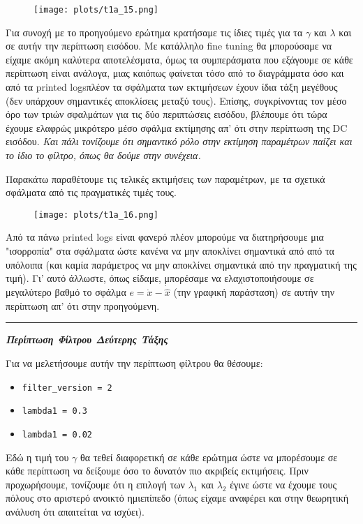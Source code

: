 \documentclass[12pt]{article} %
\numberwithin{equation}{section}  %
\begin{document}
\begin{figure}[h!]
    \centering
    \texttt{[image: plots/t1a\_15.png]}
    \caption{}
    \label{fig:t1a_15}
\end{figure}

Για συνοχή με το προηγούμενο ερώτημα κρατήσαμε τις ίδιες τιμές για τα $\gamma$ και $\lambda$ και σε αυτήν την περίπτωση εισόδου. 
Με κατάλληλο fine tuning θα μπορούσαμε να είχαμε ακόμη καλύτερα αποτελέσματα, όμως τα συμπεράσματα που εξάγουμε σε κάθε περίπτωση είναι ανάλογα, μιας και\textemdash όπως φαίνεται τόσο από το διαγράμματα όσο και από τα printed logs\textemdash πλέον τα σφάλματα των εκτιμήσεων έχουν ίδια τάξη μεγέθους (δεν υπάρχουν σημαντικές αποκλίσεις μεταξύ τους). 
Επίσης, συγκρίνοντας τον μέσο όρο των τριών σφαλμάτων για τις δύο περιπτώσεις εισόδου, βλέπουμε ότι τώρα έχουμε ελαφρώς μικρότερο μέσο σφάλμα εκτίμησης απ' ότι στην περίπτωση της DC εισόδου.
\textit{Και πάλι τονίζουμε ότι σημαντικό ρόλο στην εκτίμηση παραμέτρων παίζει και το ίδιο το φίλτρο, όπως θα δούμε στην συνέχεια.}


Παρακάτω παραθέτουμε τις τελικές εκτιμήσεις των παραμέτρων, με τα σχετικά σφάλματα από τις πραγματικές τιμές τους.

\begin{figure}[h!]
    \centering
    \texttt{[image: plots/t1a\_16.png]}
    \caption{}
    \label{fig:t1a_16}
\end{figure}

Από τα πάνω printed logs είναι φανερό πλέον μπορούμε να διατηρήσουμε μια "ισορροπία" στα σφάλματα ώστε κανένα να μην αποκλίνει σημαντικά από από τα υπόλοιπα (και καμία παράμετρος να μην αποκλίνει σημαντικά από την πραγματική της τιμή). Γι' αυτό άλλωστε, όπως είδαμε, μπορέσαμε να ελαχιστοποιήσουμε σε μεγαλύτερο βαθμό το σφάλμα $e =  \dot{x} - \dot{\hat{x}}$ (την γραφική παράσταση) σε αυτήν την περίπτωση απ' ότι στην προηγούμενη.

\hrule

\vspace{+10pt}

\noindent\textit{\textbf{Περίπτωση Φίλτρου Δεύτερης Τάξης}} 

Για να μελετήσουμε αυτήν την περίπτωση φίλτρου θα θέσουμε:
\begin{itemize}[noitemsep, nolistsep]
    \item \texttt{filter\_version = 2}
    \item \texttt{lambda1 = 0.3}
    \item \texttt{lambda1 = 0.02}
\end{itemize}
Εδώ η τιμή του $\gamma$ θα τεθεί διαφορετική σε κάθε ερώτημα ώστε να μπορέσουμε σε κάθε περίπτωση να δείξουμε όσο το δυνατόν πιο ακριβείς εκτιμήσεις. Πριν προχωρήσουμε, τονίζουμε ότι η επιλογή των $\lambda_1$ και $\lambda_2$ έγινε ώστε να έχουμε τους πόλους στο αριστερό ανοικτό ημιεπίπεδο (όπως είχαμε αναφέρει και στην θεωρητική ανάλυση ότι απαιτείται να ισχύει). 
\end{document}
